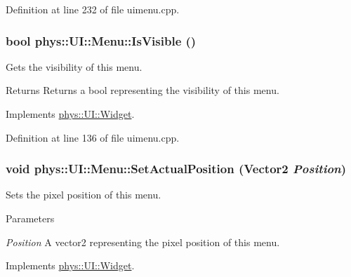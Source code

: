 Definition at line 232 of file uimenu.cpp.

\hypertarget{classphys_1_1UI_1_1Menu_ae23321617d7e14448e2fab3b455c3dc7}{
\subsubsection[{IsVisible}]{\setlength{\rightskip}{0pt plus 5cm}bool phys::UI::Menu::IsVisible ()}}
\label{d6/dd3/classphys_1_1UI_1_1Menu_ae23321617d7e14448e2fab3b455c3dc7}


Gets the visibility of this menu. 

\begin{DoxyReturn}{Returns}
Returns a bool representing the visibility of this menu. 
\end{DoxyReturn}


Implements \hyperlink{classphys_1_1UI_1_1Widget_aaf1a1bd31b8e626467ce9cdb69bdf7ac}{phys::UI::Widget}.



Definition at line 136 of file uimenu.cpp.

\hypertarget{classphys_1_1UI_1_1Menu_a47467f7de6b1a3621f23652c54041435}{
\subsubsection[{SetActualPosition}]{\setlength{\rightskip}{0pt plus 5cm}void phys::UI::Menu::SetActualPosition ({\bf Vector2} {\em Position})}}
\label{d6/dd3/classphys_1_1UI_1_1Menu_a47467f7de6b1a3621f23652c54041435}


Sets the pixel position of this menu. 


\begin{DoxyParams}{Parameters}
\item[{\em Position}]A vector2 representing the pixel position of this menu. \end{DoxyParams}


Implements \hyperlink{classphys_1_1UI_1_1Widget_ac8f70c390e7724e57fc99e51d8004a9b}{phys::UI::Widget}.



